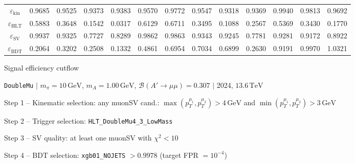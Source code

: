\documentclass[10pt,a4paper]{article}
\begin{document}
\begin{landscape}
{\begin{tabular}{c|cccc|cccc|cccc}
\midrule
$\varepsilon_{\mathrm{kin}}$ & 0.9685 & 0.9525 & 0.9373 & 0.9383 & 0.9570 & 0.9772 & 0.9547 & 0.9318 & 0.9369 & 0.9940 & 0.9813 & 0.9692\\
$\varepsilon_{\mathrm{HLT}}$ & 0.5883 & 0.3648 & 0.1542 & 0.0317 & 0.6129 & 0.6711 & 0.3495 & 0.1088 & 0.2567 & 0.5369 & 0.3430 & 0.1770\\
$\varepsilon_{\mathrm{SV}}$ & 0.9937 & 0.9325 & 0.7727 & 0.8289 & 0.9862 & 0.9863 & 0.9343 & 0.9245 & 0.7781 & 0.9281 & 0.9172 & 0.8922\\
$\varepsilon_{\mathrm{BDT}}$ & 0.2064 & 0.3202 & 0.2508 & 0.1332 & 0.4861 & 0.6954 & 0.7034 & 0.6899 & 0.2630 & 0.9191 & 0.9970 & 1.0321\\
\bottomrule
\end{tabular}}

\end{landscape}
\clearpage

{\large Signal efficiency cutflow

 \texttt{DoubleMu} $|$ $m_{\pi}=10\,\mathrm{GeV}$, $m_{A}=1.00\,\mathrm{GeV}$, $\mathcal{B}(A'\!\to\!\mu\mu)=0.307$ $|$ 2024, $13.6\,\mathrm{TeV}$}

\vspace{0.8em}

Step 1 -- Kinematic selection: any muonSV cand.: $\max(p_T^{\mu_1},p_T^{\mu_2}){>}4\,\mathrm{GeV}$ and $\min(p_T^{\mu_1},p_T^{\mu_2}){>}3\,\mathrm{GeV}$

Step 2 -- Trigger selection: \texttt{HLT\_DoubleMu4\_3\_LowMass}

Step 3 -- SV quality: at least one muonSV with $\chi^2<10$

Step 4 -- BDT selection: \texttt{xgb01\_NOJETS} $>0.9978$ (target FPR $=10^{-4}$)

\vspace{0.8em}
\end{document}
